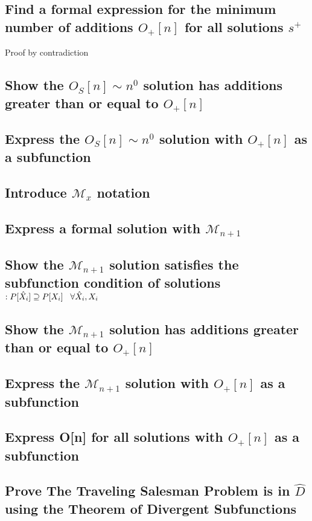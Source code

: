 \documentclass[11pt]{article}
\begin{document}
\subsection{Find a formal expression for the minimum number of additions $O_{+}[n]$ for all solutions $s^+$}
Proof by contradiction
\subsection{Show the $O_S[n] \sim n^0$ solution has additions greater than or equal to $O_{+}[n]$}
\subsection{Express the $O_S[n] \sim n^0$ solution with $O_{+}[n]$ as a subfunction}
\subsection{Introduce $\mathcal{M}_x$ notation}
\subsection{Express a formal solution with $\mathcal{M}_{n+1}$}
\subsection{Show the $\mathcal{M}_{n+1}$ solution satisfies the  subfunction condition of solutions$: P[\hat{X}_i] \supseteq P[X_i] \hspace{3mm} \forall \hat{X}_i,X_i$}
\subsection{Show the $\mathcal{M}_{n+1}$ solution has additions greater than or equal to $O_{+}[n]$}
\subsection{Express the $\mathcal{M}_{n+1}$ solution with $O_{+}[n]$ as a subfunction}
\subsection{Express O[n] for all solutions with $O_{+}[n]$ as a subfunction}
\subsection{Prove The Traveling Salesman Problem is in $\hat{D}$ using the Theorem of Divergent Subfunctions}
\end{document}
